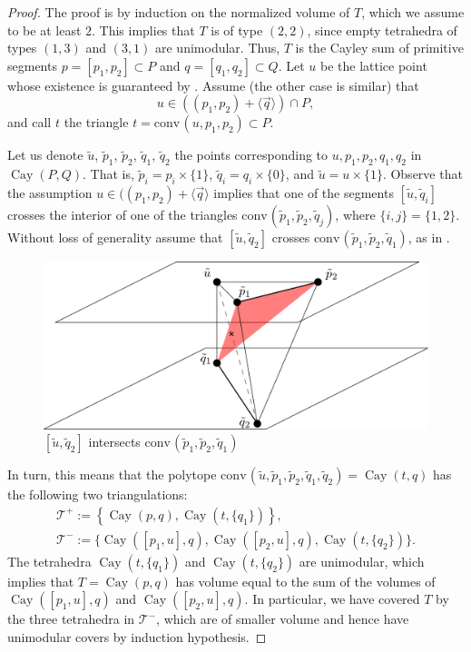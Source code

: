 \documentclass{amsart}
\theoremstyle{plain}
\theoremstyle{definition}
\renewcommand{\vec}[1]{\overrightarrow#1}
\newcommand{\vecline}[1]{\langle \vec #1 \rangle}
\newcommand{\conv}{\ensuremath{\mathrm{conv}}\hspace{1pt}}
\newcommand{\cayley}{\operatorname{Cay}}
\begin{document}
\begin{proof}
The proof is by induction on the normalized volume of $T$, which we assume to be at least $2$. This implies that $T$ is of type $(2,2)$,
since empty tetrahedra of types $(1,3)$ and $(3,1)$ are unimodular. Thus, $T$ is the Cayley sum of primitive segments $p=[p_1,p_2]\subset P$ and $q=[q_1,q_2]\subset Q$.  
Let $u$ be the lattice point whose existence is guaranteed by . Assume  (the other case is similar) that 
\[
u \in ((p_1, p_2) + \vecline q ) \cap P,
\]
and call $t$ the triangle $t=\conv( u,  p_1,  p_2)\subset P$.

Let us denote $\tilde u$, $\tilde p_1$, $\tilde p_2$, $\tilde q_1$, $\tilde q_2$ the points corresponding to $u, p_1, p_2, q_1, q_2$ in $\cayley(P,Q)$.
That is, $\tilde p_i = p_i\times\{1\}$, $\tilde q_i = 	q_i\times\{0\}$, and $\tilde u = u\times\{1\}$.
Observe that the assumption $u\in((p_1, p_2) + \vecline q$ implies that one of the segments $[\tilde u,\tilde q_i]$ crosses the interior of one of the triangles $\conv(\tilde p_1,\tilde p_2,\tilde q_j)$, where $\{i,j\}=\{1,2\}$. Without loss of generality assume that $[\tilde{u},\tilde{q}_2]$ crosses $\conv(\tilde{p}_1,\tilde{p}_2,\tilde{q}_1)$, as in . 

\begin{figure}[htb]
\includegraphics[scale=.3]{flip}
\caption{$[\tilde{u},\tilde{q}_2]$ intersects $\conv(\tilde{p}_1,\tilde{p}_2,\tilde{q}_1)$}
\label{fig:flip}
\end{figure}

In turn, this means that the polytope $\conv(\tilde u, \tilde p_1, \tilde p_2, \tilde q_1, \tilde q_2) = \cayley(t,q)$
 has the following two triangulations:
\begin{gather*}
\mathcal T^+:= \left\{ \cayley(p,q), \cayley(t, \{q_1\}) \right\},
\\
\mathcal T^-:= \{ \cayley([p_1,u],q), \cayley([p_2,u],q), \cayley(t, \{q_2\}) \}.
\end{gather*}
The tetrahedra $\cayley(t, \{q_1\})$ and $\cayley(t, \{q_2\})$ are unimodular, which implies that $T=\cayley(p,q)$ has volume equal to the sum of the volumes of $\cayley([p_1,u],q)$ and $\cayley([p_2,u],q)$. In particular, we have covered $T$ by the three tetrahedra in $\mathcal T^-$, which are of smaller volume and hence have unimodular covers by induction hypothesis.
\end{proof}
\end{document}
